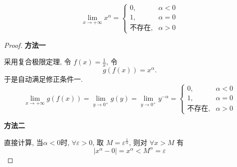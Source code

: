\begin{example}
    \begin{equation}
      \lim_{x \to +\infty} x^{\alpha} = \begin{cases} 
        0, & \alpha < 0 
        \\ 
        1, & \alpha = 0
        \\
        \text{不存在}, & \alpha > 0 
      \end{cases}
    \end{equation}
\end{example}
\begin{proof}
    \textbf{方法一}

    采用复合极限定理, 令 $f \left( x \right)  = \frac{1}{x}$, 令
    \begin{equation}
      g \left( f \left( x \right)  \right) = x^{\alpha}.
    \end{equation}
    于是自动满足修正条件一.
    \begin{equation}
      \lim_{x \to +\infty} g \left( f \left( x \right)  \right) = \lim_{y \to 0^{+}} g \left( y \right) = \lim_{y \to 0^{+}} y^{-\alpha} = \begin{cases} 
        0, & \alpha < 0 
        \\ 
        1, & \alpha = 0
        \\
        \text{不存在}, & \alpha > 0
      \end{cases}
    \end{equation}

    \textbf{方法二}

    直接计算, 当$\alpha < 0$时, $\forall \varepsilon > 0$, 取 $M = \varepsilon^{\frac{1}{\alpha}}$, 则对 $\forall  x > M$ 有
    \begin{equation}
        \left| x^{\alpha} - 0 \right| = x^{\alpha} < M ^{\alpha} = \varepsilon
    \end{equation}
\end{proof}

